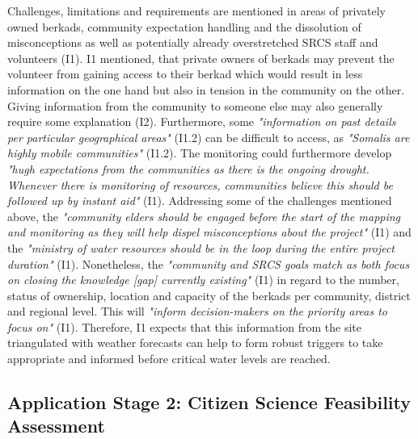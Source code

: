 Challenges, limitations and requirements are mentioned in areas of privately owned berkads, community expectation handling and the dissolution of misconceptions as well as potentially already overstretched SRCS staff and volunteers (I1). I1 mentioned, that private owners of berkads may prevent the volunteer from gaining access to their berkad which would result in less information on the one hand but also in tension in the community on the other. Giving information from the community to someone else may also generally require some explanation (I2). Furthermore, some \textit{"information on past details per particular geographical areas"} (I1.2) can be difficult to access, as \textit{"Somalis are highly mobile communities"} (I1.2). The monitoring could furthermore develop \textit{"hugh expectations from the communities as there is the ongoing drought. Whenever there is monitoring of resources, communities believe this should be followed up by instant aid"} (I1).\newline
Addressing some of the challenges mentioned above, the \textit{"community elders should be engaged before the start of the mapping and monitoring as they will help dispel misconceptions about the project"} (I1) and the \textit{"ministry of water resources should be in the loop during the entire project duration"} (I1). Nonetheless, the \textit{"community and SRCS goals match as both focus on closing the knowledge [gap] currently existing"} (I1) in regard to the number, status of ownership, location and capacity of the berkads per community, district and regional level. This will \textit{"inform decision-makers on the priority areas to focus on"} (I1). Therefore, I1 expects that this information from the site triangulated with weather forecasts can help to form robust triggers to take appropriate and informed  before critical water levels are reached.

\subsection{Application Stage 2: Citizen Science Feasibility Assessment}\label{subsec:stage2_appl}


